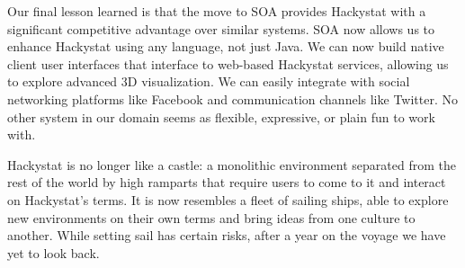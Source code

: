 \documentclass[conference,compsoc]{IEEEtran}
\begin{document}
Our final lesson learned is that the move to SOA provides Hackystat with a
significant competitive advantage over similar systems.  SOA now allows us
to enhance Hackystat using any language, not just Java.  We can now build
native client user interfaces that interface to web-based Hackystat
services, allowing us to explore advanced 3D visualization.  We can easily
integrate with social networking platforms like Facebook and communication
channels like Twitter.  No other system in our domain seems as flexible,
expressive, or plain fun to work with.

Hackystat is no longer like a castle: a monolithic environment separated
from the rest of the world by high ramparts that require users to come to it
and interact on Hackystat's terms. It is now resembles a fleet of sailing
ships, able to explore new environments on their own terms and bring ideas
from one culture to another.  While setting sail has certain risks, after a year 
on the voyage we have yet to look back. 



\end{document}
